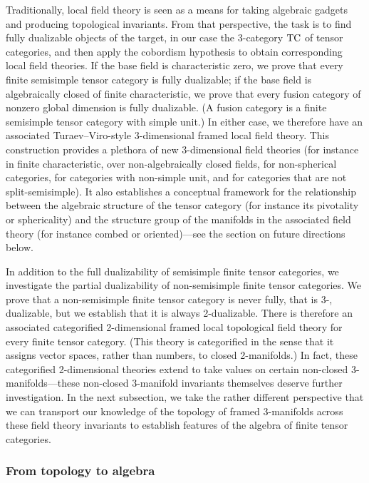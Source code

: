 \documentclass{amsart}
\begin{document}
Traditionally, local field theory is seen as a means for taking algebraic gadgets and producing topological invariants.  From that perspective, the task is to find fully dualizable objects of the target, in our case the 3-category $\mathrm{TC}$ of tensor categories, and then apply the cobordism hypothesis to obtain corresponding local field theories.  If the base field is characteristic zero, we prove that every finite semisimple tensor category is fully dualizable; if the base field is algebraically closed of finite characteristic, we prove that every fusion category of nonzero global dimension is fully dualizable.  (A fusion category is a finite semisimple tensor category with simple unit.)  In either case, we therefore have an associated Turaev--Viro-style 3-dimensional framed local field theory.  This construction provides a plethora of new 3-dimensional field theories (for instance in finite characteristic, over non-algebraically closed fields, for non-spherical categories, for categories with non-simple unit, and for categories that are not split-semisimple).  It also establishes a conceptual framework for the relationship between the algebraic structure of the tensor category (for instance its pivotality or sphericality) and the structure group of the manifolds in the associated field theory (for instance combed or oriented)---see the section on future directions below.  

In addition to the full dualizability of semisimple finite tensor categories, we investigate the partial dualizability of non-semisimple finite tensor categories.  We prove that a non-semisimple finite tensor category is never fully, that is 3-, dualizable, but we establish that it is always 2-dualizable.  There is therefore an associated categorified 2-dimensional framed local topological field theory for every finite tensor category.  (This theory is categorified in the sense that it assigns vector spaces, rather than numbers, to closed 2-manifolds.)  In fact, these categorified 2-dimensional theories extend to take values on certain non-closed 3-manifolds---these non-closed 3-manifold invariants themselves deserve further investigation.  In the next subsection, we take the rather different perspective that we can transport our knowledge of the topology of framed 3-manifolds across these field theory invariants to establish features of the algebra of finite tensor categories.



\subsubsection{From topology to algebra}
\end{document}
